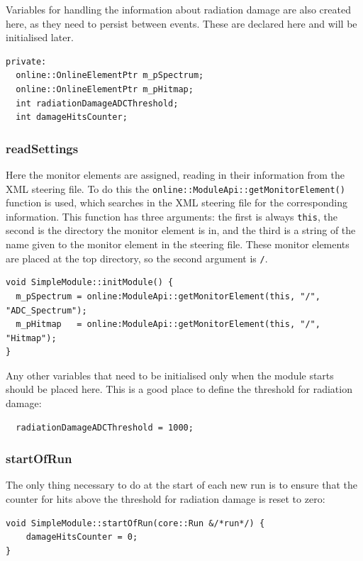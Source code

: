 Variables for handling the information about radiation damage are also created here, as they need to persist between events. These are declared here and will be initialised later.

\begin{lstlisting}
private:
  online::OnlineElementPtr m_pSpectrum;
  online::OnlineElementPtr m_pHitmap;
  int radiationDamageADCThreshold;
  int damageHitsCounter;
\end{lstlisting}

\subsubsection{readSettings}
Here the monitor elements are assigned, reading in their information from the \acrshort{XML} steering file. To do this the \texttt{online::ModuleApi::getMonitorElement()} function is used, which searches in the \acrshort{XML} steering file for the corresponding information. This function has three arguments: the first is always \texttt{this}, the second is the directory the monitor element is in, and the third is a string of the name given to the monitor element in the steering file. These monitor elements are placed at the top directory, so the second argument is \texttt{/}.

\begin{lstlisting}
void SimpleModule::initModule() {
  m_pSpectrum = online:ModuleApi::getMonitorElement(this, "/", "ADC_Spectrum");
  m_pHitmap   = online:ModuleApi::getMonitorElement(this, "/", "Hitmap");
}
\end{lstlisting}

Any other variables that need to be initialised only when the module starts should be placed here. This is a good place to define the threshold for radiation damage:

\begin{lstlisting}
  radiationDamageADCThreshold = 1000;
\end{lstlisting}

\subsubsection{startOfRun}
The only thing necessary to do at the start of each new run is to ensure that the counter for hits above the threshold for radiation damage is reset to zero:

\begin{lstlisting}
void SimpleModule::startOfRun(core::Run &/*run*/) {
    damageHitsCounter = 0;
}
\end{lstlisting}

